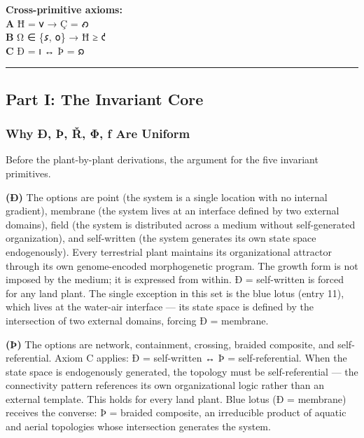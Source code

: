 \textbf{Cross-primitive axioms:}\\
\textbf{A} Ħ = 𐑫 → Ç = 𐑺\\
\textbf{B} Ω ∈ \{𐑭, 𐑴\} → Ħ ≥ 𐑒\\
\textbf{C} Ð = 𐑦 ↔ Þ = 𐑸

\begin{center}\rule{0.5\linewidth}{0.5pt}\end{center}

\hypertarget{part-i-the-invariant-core}{%
\subsection{Part I: The Invariant
Core}\label{part-i-the-invariant-core}}

\hypertarget{why-uxf0-uxfe-ux159-ux3c6-ux192-are-uniform}{%
\subsubsection{Why Ð, Þ, Ř, Φ, ƒ Are
Uniform}\label{why-uxf0-uxfe-ux159-ux3c6-ux192-are-uniform}}

Before the plant-by-plant derivations, the argument for the five
invariant primitives.

\textbf{(Ð)} The options are point (the system is a single location with
no internal gradient), membrane (the system lives at an interface
defined by two external domains), field (the system is distributed
across a medium without self-generated organization), and self-written
(the system generates its own state space endogenously). Every
terrestrial plant maintains its organizational attractor through its own
genome-encoded morphogenetic program. The growth form is not imposed by
the medium; it is expressed from within. Ð = self-written is forced for
any land plant. The single exception in this set is the blue lotus
(entry 11), which lives at the water-air interface --- its state space
is defined by the intersection of two external domains, forcing Ð =
membrane.

\textbf{(Þ)} The options are network, containment, crossing, braided
composite, and self-referential. Axiom C applies: Ð = self-written ↔ Þ =
self-referential. When the state space is endogenously generated, the
topology must be self-referential --- the connectivity pattern
references its own organizational logic rather than an external
template. This holds for every land plant. Blue lotus (Ð = membrane)
receives the converse: Þ = braided composite, an irreducible product of
aquatic and aerial topologies whose intersection generates the system.

